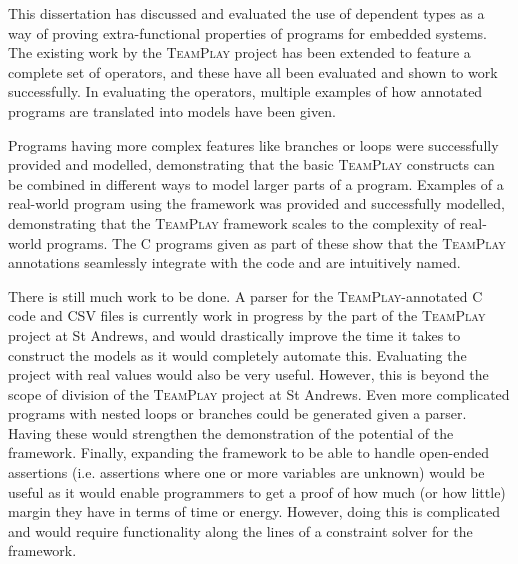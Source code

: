 This dissertation has discussed and evaluated the use of dependent types as a way of proving extra-functional properties of programs for embedded systems. The existing work by the \textsc{TeamPlay} project has been extended to feature a complete set of operators, and these have all been evaluated and shown to work successfully. In evaluating the operators, multiple examples of how annotated programs are translated into \Idris models have been given.

Programs having more complex features like branches or loops were successfully provided and modelled, demonstrating that the basic \textsc{TeamPlay} constructs can be combined in different ways to model larger parts of a program. Examples of a real-world program using the framework was provided and successfully modelled, demonstrating that the \textsc{TeamPlay} framework scales to the complexity of real-world programs. The C programs given as part of these show that the \textsc{TeamPlay} annotations seamlessly integrate with the code and are intuitively named.

There is still much work to be done. A parser for the \textsc{TeamPlay}-annotated C code and CSV files is currently work in progress by the part of the \textsc{TeamPlay} project at St Andrews, and would drastically improve the time it takes to construct the \Idris models as it would completely automate this. Evaluating the project with real values would also be very useful. However, this is beyond the scope of division of the \textsc{TeamPlay} project at St Andrews. Even more complicated programs with nested loops or branches could be generated given a parser. Having these would strengthen the demonstration of the potential of the framework. Finally, expanding the framework to be able to handle open-ended assertions (i.e. assertions where one or more variables are unknown) would be useful as it would enable programmers to get a proof of how much (or how little) margin they have in terms of time or energy. However, doing this is complicated and would require functionality along the lines of a constraint solver for the framework.
